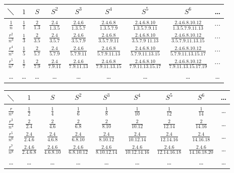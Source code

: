 \documentclass[11pt]{article}
\newcommand{\scanpage}[2]{\clearpage\setcounter{footnote}{0}\noindent{\footnotesize\color{gray}PDF #1 頁 · #2}\par\medskip}
\begin{document}
\begin{center}
\renewcommand{\arraystretch}{2.2}\setlength{\tabcolsep}{4pt}
\begin{tabular}{|c||c|c|c|c|c|c|c|c|}
\hline
$\diagdown$ & $1$ & $S$ & $S^2$ & $S^3$ & $S^4$ & $S^5$ & $S^6$ & \dots\\
\hline\hline
$\frac{1}{n}$ & $\frac{1}{1}$ & $\frac{2}{1.3}$ & $\frac{2.4}{1.3.5}$ & $\frac{2.4.6}{1.3.5.7}$ & $\frac{2.4.6.8}{1.3.5.7.9}$ & $\frac{2.4.6.8.10}{1.3.5.7.9.11}$ & $\frac{2.4.6.8.10.12}{1.3.5.7.9.11.13}$ & $\cdots$\\
\hline
$\frac{r^2}{n^3}$ & $\frac{1}{3}$ & $\frac{2}{3.5}$ & $\frac{2.4}{3.5.7}$ & $\frac{2.4.6}{3.5.7.9}$ & $\frac{2.4.6.8}{3.5.7.9.11}$ & $\frac{2.4.6.8.10}{3.5.7.9\;11.13}$ & $\frac{2.4.6.8.10.12}{3.5.7.9.11.13.15}$ & $\cdots$\\
\hline
$\frac{r^4}{n^5}$ & $\frac{1}{5}$ & $\frac{2}{5.7}$ & $\frac{2.4}{5.7.9}$ & $\frac{2.4.6}{5.7.9.11}$ & $\frac{2.4.6.8}{5.7.9.11.13}$ & $\frac{2.4.6.8.10}{5.7.9.11.13.15}$ & $\frac{2.4.6.8.10.12}{5.7.9.11.13.15.17}$ & $\cdots$\\
\hline
$\frac{r^5}{n^7}$ & $\frac{1}{7}$ & $\frac{2}{7.9}$ & $\frac{2.4}{7.9.11}$ & $\frac{2.4.6}{7.9.11.13}$ & $\frac{2.4.6.8}{7.9.11.13.15}$ & $\frac{2.4.6.8.10}{7.9.11.13.15.17}$ & $\frac{2.4.6.8.10.12}{7.9.11.13.15.17.19}$ & $\cdots$\\
\hline
\dots & \dots & \dots & \dots & \dots & \dots & \dots & \dots & \dots\\
\hline
\end{tabular}
\end{center}

\scanpage{0285}{印刷頁 271}
\begin{center}
\renewcommand{\arraystretch}{1.8}
\begin{tabular}{|c||c|c|c|c|c|c|c|c|}
\hline
$\diagdown$ & $1$ & $S$ & $S^2$ & $S^3$ & $S^4$ & $S^5$ & $S^6$ & \dots \\
\hline\hline
$\frac{r}{n^2}$ & $\frac{1}{2}$ & $\frac{1}{4}$ & $\frac{1}{6}$ & $\frac{1}{8}$ & $\frac{1}{10}$ & $\frac{1}{12}$ & $\frac{1}{14}$ & \dots \\
\hline
$\frac{r^3}{n^4}$ & $\frac{2}{2.4}$ & $\frac{2}{4.6}$ & $\frac{2}{6.8}$ & $\frac{2}{8.10}$ & $\frac{2}{10.12}$ & $\frac{2}{12.14}$ & $\frac{2}{14.16}$ & \dots \\
\hline
$\frac{r^5}{n^6}$ & $\frac{2.4}{2.4.6}$ & $\frac{2.4}{4.6.8}$ & $\frac{2.4}{6.8.10}$ & $\frac{2.4}{8.10.12}$ & $\frac{2.4}{10.12.14}$ & $\frac{2.4}{12.14.16}$ & $\frac{2.4}{14.16.18}$ & \dots \\
\hline
$\frac{r^7}{n^8}$ & $\frac{2.4.6}{2.4.6.8}$ & $\frac{2.4.6}{4.6.8.10}$ & $\frac{2.4.6}{6.8.10.12}$ & $\frac{2.4.6}{8.10.12.14}$ & $\frac{2.4.6}{10.12.14.16}$ & $\frac{2.4.6}{12.14.16.18}$ & $\frac{2.4.6}{14.16.18.20}$ & \dots \\
\hline
\dots & \dots & \dots & \dots & \dots & \dots & \dots & \dots & \dots \\
\hline
\end{tabular}
\end{center}
\end{document}
